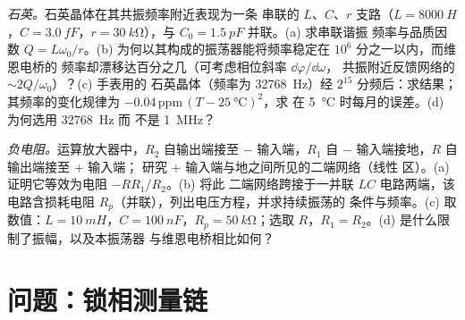 \begin{exercise}[$\star\star\star$]\label{exo:b2:feedback-oscillators:11}
\emph{石英。}石英晶体在其共振频率附近表现为一条
串联的 $L$、$C$、$r$ 支路（$L = \qty{8000}{H}$，$C = \qty{3.0}{fF}$，$r =
\qty{30}{k\ohm}$），与 $C_0 = \qty{1.5}{pF}$ 并联。(a) 求串联谐振
频率与品质因数 $Q = L\omega_0/r$。(b) 为何以其构成的振荡器能将频率稳定在
$10^6$ 分之一以内，而维恩电桥的
频率却漂移达百分之几（可考虑相位斜率 $\dd\varphi/\dd\omega$，
共振附近反馈网络的 $\sim 2Q/\omega_0$）？(c) 手表用的
石英晶体（频率为 \qty{32768}{Hz}）经 $2^{15}$ 分频后：求结果；
其频率的变化规律为 $-0.04\,\text{ppm}\,(T - \qty{25}{\degreeCelsius})^2$，求
在 \qty{5}{\degreeCelsius} 时每月的误差。(d) 为何选用 \qty{32768}{Hz} 而
不是 \qty{1}{MHz}？
\end{exercise}

\begin{exercise}[$\star\star\star$]\label{exo:b2:feedback-oscillators:12}
\emph{负电阻。}运算放大器中，$R_2$ 自输出端接至 $-$
输入端，$R_1$ 自 $-$ 输入端接地，$R$ 自输出端接至 $+$ 输入端；
研究 $+$ 输入端与地之间所见的二端网络（线性
区）。(a) 证明它等效为电阻 $-RR_1/R_2$。(b) 将此
二端网络跨接于一并联 $LC$ 电路两端，该电路含损耗电阻
$R_p$（并联），列出电压方程，并求持续振荡的
条件与频率。(c) 取数值：$L
= \qty{10}{mH}$，$C = \qty{100}{nF}$，$R_p = \qty{50}{k\ohm}$；选取 $R$，$R_1 =
R_2$。(d) 是什么限制了振幅，以及本振荡器
与维恩电桥相比如何？
\end{exercise}

\section{问题：锁相测量链}


